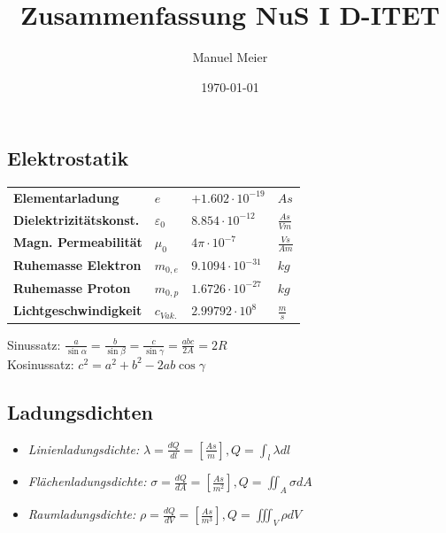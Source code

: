 \documentclass[a4paper, 6pt, landscape]{scrartcl}
\title{Zusammenfassung NuS I D-ITET}
\author{Manuel Meier}
\date{\today}
\begin{document}
	\begin{multicols*}{4}
		\maketitle
			\section{Elektrostatik}
				\doublespacing			
				\begin{tabular}{llll}
					\textbf{Elementarladung} &$e  $&$ +1.602\cdot 10^{-19}$&$As$\\
					\textbf{Dielektrizitätskonst.}& $\varepsilon_0  $&$ 8.854\cdot 10^{-12}$&$\frac{As}{Vm}$\\
					\textbf{Magn. Permeabilität}& $\mu_0  $&$ 4\pi\cdot 10^{-7}$&$\frac{Vs}{Am}$\\
					\textbf{Ruhemasse Elektron}& $m_{0,e}  $&$ 9.1094\cdot 10^{-31}$&$kg$\\
					\textbf{Ruhemasse Proton} &$m_{0,p}  $&$ 1.6726\cdot 10^{-27}$&$kg$\\
					\textbf{Lichtgeschwindigkeit} &$c_{Vak.}  $&$ 2.99792\cdot 10^8$&$\frac{m}{s}$\\
				\end{tabular}
				
				Sinussatz: $\frac{a}{\sin \alpha} = \frac{b}{\sin \beta} = \frac{c}{\sin \gamma} = \frac{abc}{2A} = 2R$\\
Kosinussatz: $c^2 = a^2 + b^2 -2ab\cos \gamma$
				\singlespacing 				
				\subsection{Ladungsdichten}
				\begin{itemize}
					\item \textit{Linienladungsdichte:} $\lambda=\frac{dQ}{dl}=\left[\frac{As}{m}\right], Q=\int_l\lambda dl$
					\item \textit{Flächenladungsdichte:} $\sigma=\frac{dQ}{dA}=\left[\frac{As}{m^2}\right], Q=\iint_A\sigma dA$
					\item \textit{Raumladungsdichte:} $\rho=\frac{dQ}{dV}=\left[\frac{As}{m^3}\right],Q=\iiint_V\rho dV$
				\end{itemize}
				

\end{multicols*}
\end{document}
